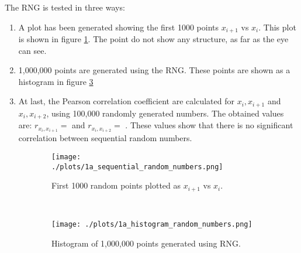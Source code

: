 The RNG is tested in three ways:
\begin{enumerate}
  \item A plot has been generated showing the first 1000 points $x_{i+1}$ vs $x_i$. This plot is shown in figure \ref{fig:1a1}. The point do not show any structure, as far as the eye can see.
  \item 1,000,000 points are generated using the RNG. These points are shown as a histogram in figure \ref{fig:1a2}
  \item At last, the Pearson correlation coefficient are calculated for $x_i,x_{i+1}$ and $x_i, x_{i+2}$, using 100,000 randomly generated numbers. The obtained values are: $r_{x_i,x_{i+1}} = $  and $r_{x_i,x_{i+2}} = $ . These values show that there is no significant correlation between sequential random numbers.
\end{enumerate}

\begin{figure}[ht]
  \centering
  \begin{subfigure}[t]{0.49\textwidth}
    
    \texttt{[image: ./plots/1a\_sequential\_random\_numbers.png]}
    \caption{First 1000 random points plotted as $x_{i+1}$ vs $x_i$.}
    \label{fig:1a1}
  \end{subfigure}
  ~
  \begin{subfigure}[t]{0.49\textwidth}
    \texttt{[image: ./plots/1a\_histogram\_random\_numbers.png]}
    \caption{Histogram of 1,000,000 points generated using RNG.}
    \label{fig:1a2}
  \end{subfigure}
  \caption{}
\end{figure}



